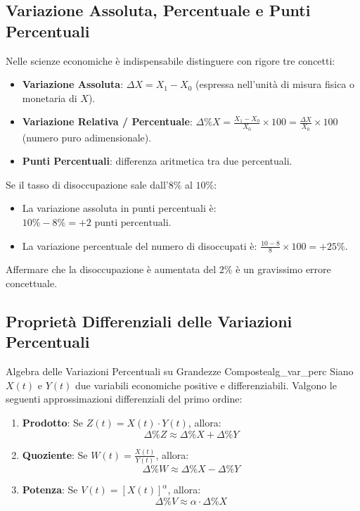\subsection{Variazione Assoluta, Percentuale e Punti Percentuali}
Nelle scienze economiche è indispensabile distinguere con rigore tre concetti:
\begin{itemize}
    \item \textbf{Variazione Assoluta}: $\Delta X = X_1 - X_0$ (espressa nell'unità di misura fisica o monetaria di $X$).
    \item \textbf{Variazione Relativa / Percentuale}: $\Delta\% X = \frac{X_1 - X_0}{X_0} \times 100 = \frac{\Delta X}{X_0} \times 100$ (numero puro adimensionale).
    \item \textbf{Punti Percentuali}: differenza aritmetica tra due percentuali.
\end{itemize}

\begin{esame}
Se il tasso di disoccupazione sale dall'$8\%$ al $10\%$:
\begin{itemize}
    \item La variazione assoluta in punti percentuali è: $10\% - 8\% = +2 \text{ punti percentuali}$.
    \item La variazione percentuale del numero di disoccupati è: $\frac{10 - 8}{8} \times 100 = +25\%$.
\end{itemize}
Affermare che la disoccupazione è aumentata del $2\%$ è un gravissimo errore concettuale.
\end{esame}

\subsection{Proprietà Differenziali delle Variazioni Percentuali}

\begin{teorema}{Algebra delle Variazioni Percentuali su Grandezze Composte}{alg_var_perc}
Siano $X(t)$ e $Y(t)$ due variabili economiche positive e differenziabili. Valgono le seguenti approssimazioni differenziali del primo ordine:
\begin{enumerate}
    \item \textbf{Prodotto}: Se $Z(t) = X(t) \cdot Y(t)$, allora:
    \begin{equation}
        \Delta\% Z \approx \Delta\% X + \Delta\% Y
    \end{equation}
    \item \textbf{Quoziente}: Se $W(t) = \frac{X(t)}{Y(t)}$, allora:
    \begin{equation}
        \Delta\% W \approx \Delta\% X - \Delta\% Y
    \end{equation}
    \item \textbf{Potenza}: Se $V(t) = [X(t)]^\alpha$, allora:
    \begin{equation}
        \Delta\% V \approx \alpha \cdot \Delta\% X
    \end{equation}
\end{enumerate}
\end{teorema}

